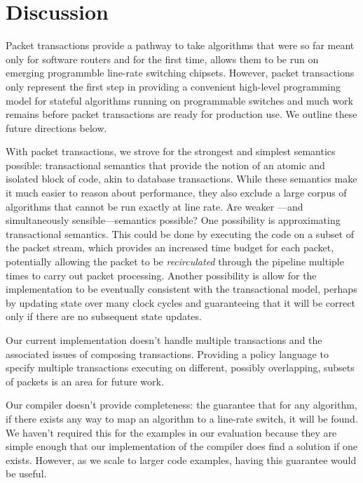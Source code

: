\section{Discussion}
Packet transactions provide a pathway to take algorithms that were so far meant
only for software routers and for the first time, allows them to be run on
emerging programmble line-rate switching chipsets. However, packet transactions
only represent the first step in providing a convenient high-level programming
model for stateful algorithms running on programmable switches and much work
remains before packet transactions are ready for production use. We outline
these future directions below.

\begin{CompactEnumerate}
\item With packet transactions, we strove for the strongest and simplest
semantics possible: transactional semantics that provide the notion of an
atomic and isolated block of code, akin to database transactions. While these
semantics make it much easier to reason about performance, they also exclude a
large corpus of algorithms that cannot be run exactly at line rate. Are weaker
---and simultaneously sensible---semantics possible? One possibility is
approximating transactional semantics. This could be done by executing the code
on a subset of the packet stream, which provides an increased time budget for
each packet, potentially allowing the packet to be {\em recirculated} through
the pipeline multiple times to carry out packet processing. Another possibility
is allow for the implementation to be eventually consistent with the
transactional model, perhaps by updating state over many clock cycles and
guaranteeing that it will be correct only if there are no subsequent state
updates.
\item Our current implementation doesn't handle multiple transactions and the
associated issues of composing transactions. Providing a policy language to
specify multiple transactions executing on different, possibly overlapping,
subsets of packets is an area for future work.
\item Our compiler doesn't provide completeness: the guarantee that for any
algorithm, if there exists any way to map an algorithm to a line-rate switch,
it will be found. We haven't required this for the examples in our evaluation
because they are simple enough that our implementation of the compiler does
find a solution if one exists. However, as we scale to larger code examples,
having this guarantee would be useful.

\end{CompactEnumerate}
